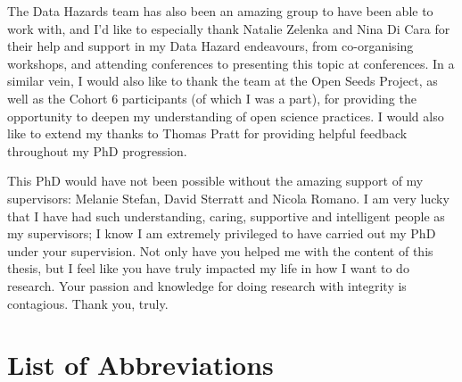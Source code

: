 \documentclass[
  11pt,
  letterpaper,
]{scrreprt}
\begin{document}
The Data Hazards team has also been an amazing group to have been able
to work with, and I'd like to especially thank Natalie Zelenka and Nina
Di Cara for their help and support in my Data Hazard endeavours, from
co-organising workshops, and attending conferences to presenting this
topic at conferences. In a similar vein, I would also like to thank the
team at the Open Seeds Project, as well as the Cohort 6 participants (of
which I was a part), for providing the opportunity to deepen my
understanding of open science practices. I would also like to extend my
thanks to Thomas Pratt for providing helpful feedback throughout my PhD
progression.

This PhD would have not been possible without the amazing support of my
supervisors: Melanie Stefan, David Sterratt and Nicola Romano. I am very
lucky that I have had such understanding, caring, supportive and
intelligent people as my supervisors; I know I am extremely privileged
to have carried out my PhD under your supervision. Not only have you
helped me with the content of this thesis, but I feel like you have
truly impacted my life in how I want to do research. Your passion and
knowledge for doing research with integrity is contagious. Thank you,
truly.

\clearpage
{
\hypersetup{linkcolor=black}
\setcounter{tocdepth}{3}
\tableofcontents
\listoffigures
}


\chapter*{List of Abbreviations}\label{list-of-abbreviations}


\noindent
\end{document}
